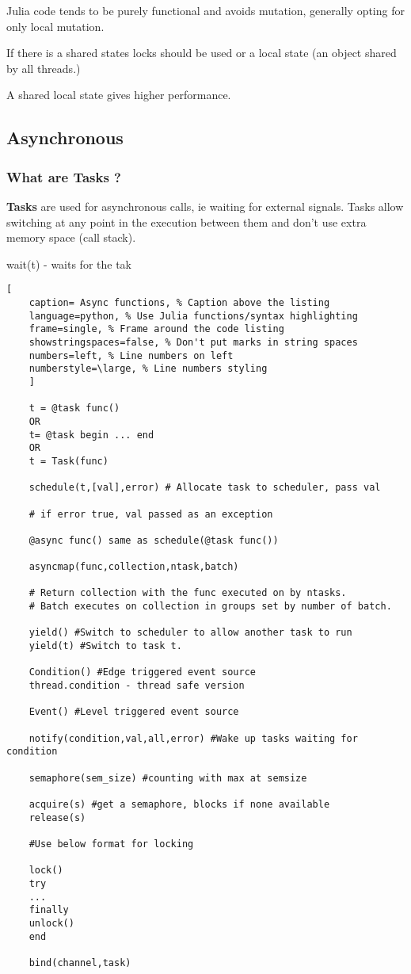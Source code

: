 \documentclass[11pt]{scrartcl} %
\begin{document}
Julia code tends to be purely functional and avoids mutation, generally opting for only local mutation.

If there is a shared states locks should be used or a local state (an object shared by all threads.)

A shared local state gives higher performance.

\subsection{Asynchronous}

\subsubsection{What are Tasks ?}

\textbf{Tasks} are used for asynchronous calls, ie waiting for external signals. Tasks allow switching at any
point in the execution between them and don't use extra memory space (call stack).

wait(t) - waits for the tak
\begin{lstlisting}[
	caption= Async functions, % Caption above the listing
	language=python, % Use Julia functions/syntax highlighting
	frame=single, % Frame around the code listing
	showstringspaces=false, % Don't put marks in string spaces
	numbers=left, % Line numbers on left
	numberstyle=\large, % Line numbers styling
	]

	t = @task func()
	OR
	t= @task begin ... end
	OR	
	t = Task(func)

	schedule(t,[val],error) # Allocate task to scheduler, pass val

	# if error true, val passed as an exception

	@async func() same as schedule(@task func())

	asyncmap(func,collection,ntask,batch) 
	
	# Return collection with the func executed on by ntasks.
	# Batch executes on collection in groups set by number of batch.

	yield() #Switch to scheduler to allow another task to run
	yield(t) #Switch to task t.

	Condition() #Edge triggered event source
	thread.condition - thread safe version

	Event() #Level triggered event source

	notify(condition,val,all,error) #Wake up tasks waiting for condition

	semaphore(sem_size) #counting with max at semsize

	acquire(s) #get a semaphore, blocks if none available
	release(s)

	#Use below format for locking

	lock()
	try
	...
	finally
	unlock()
	end

	bind(channel,task) 

\end{lstlisting}
\end{document}
